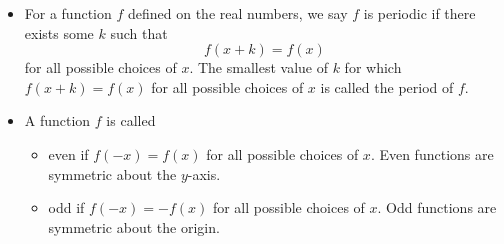\documentclass[nooutcomes]{ximera}
\begin{document}
\begin{summary}\begin{itemize}
\item For a function $f$ defined on the real numbers, we say $f$ is periodic if there exists some $k$ such that
\begin{equation*}
f(x + k) = f(x)
\end{equation*}
for all possible choices of $x$. The smallest value of $k$ for which $f(x + k) = f(x)$ for all possible choices of $x$ is called the period of $f$.
\item A function $f$ is called
\begin{itemize}
\item even if $f(-x) = f(x)$ for all possible choices of $x$. Even functions are symmetric about the $y$-axis. 
\item odd if $f(-x) = -f(x)$ for all possible choices of $x$. Odd functions are symmetric about the origin. 
\end{itemize}
\end{itemize}\end{summary}
\end{document}
